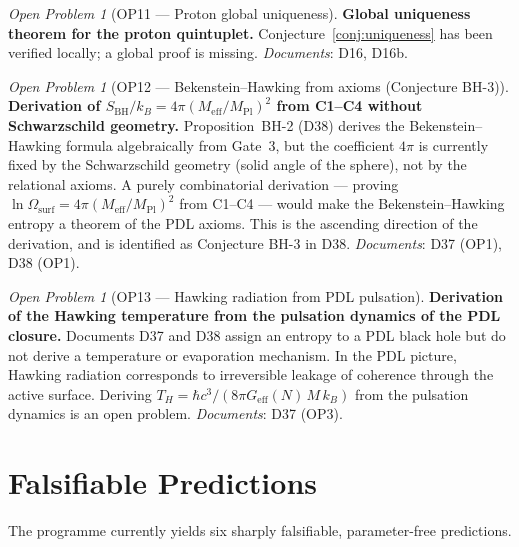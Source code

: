 \documentclass[11pt,a4paper]{article}
\theoremstyle{plain}
\theoremstyle{definition}
\theoremstyle{remark}
\newtheorem{openproblem}[theorem]{Open Problem}
\newcommand{\Geff}{G_{\mathrm{eff}}}
\newcommand{\SBH}{S_{\mathrm{BH}}}
\newcommand{\Meff}{M_{\mathrm{eff}}}
\newcommand{\MPl}{M_{\mathrm{Pl}}}
\begin{document}
\begin{openproblem}[OP11 — Proton global uniqueness]
\label{op:uniqueness}
\textbf{Global uniqueness theorem for the proton quintuplet.}
Conjecture~\ref{conj:uniqueness} has been verified locally; a global proof is missing.
\emph{Documents}: D16, D16b.
\end{openproblem}

\begin{openproblem}[OP12 — Bekenstein--Hawking from axioms (Conjecture BH-3)]
\label{op:BH3}
\textbf{Derivation of $\SBH/k_B = 4\pi(\Meff/\MPl)^2$ from C1--C4 without Schwarzschild geometry.}
Proposition~BH-2 (D38) derives the Bekenstein--Hawking formula algebraically from Gate~3, but the coefficient $4\pi$ is currently fixed by the Schwarzschild geometry (solid angle of the sphere), not by the relational axioms.
A purely combinatorial derivation — proving $\ln\Omega_{\mathrm{surf}} = 4\pi(\Meff/\MPl)^2$ from C1--C4 — would make the Bekenstein--Hawking entropy a theorem of the PDL axioms.
This is the ascending direction of the derivation, and is identified as Conjecture BH-3 in D38.
\emph{Documents}: D37 (OP1), D38 (OP1).
\end{openproblem}

\begin{openproblem}[OP13 — Hawking radiation from PDL pulsation]
\label{op:hawking}
\textbf{Derivation of the Hawking temperature from the pulsation dynamics of the PDL closure.}
Documents D37 and D38 assign an entropy to a PDL black hole but do not derive a temperature or evaporation mechanism.
In the PDL picture, Hawking radiation corresponds to irreversible leakage of coherence through the active surface.
Deriving $T_H = \hbar c^3/(8\pi\Geff(N)\,M\,k_B)$ from the pulsation dynamics is an open problem.
\emph{Documents}: D37 (OP3).
\end{openproblem}

\section{Falsifiable Predictions}
\label{sec:predictions}

The programme currently yields six sharply falsifiable, parameter-free predictions.
\end{document}
